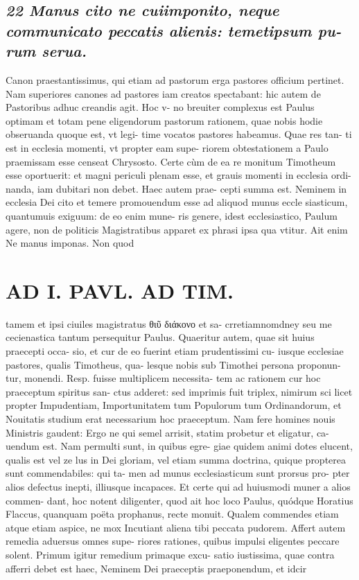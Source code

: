 \documentclass{article}
\begin{document}
\begin{pages}
\subsection*{\textit{22 Manus cito ne cuiimponito, neque communicato peccatis alienis: temetipsum pu- rum serua. }}\pstart Canon praestantissimus, qui etiam ad pastorum erga pastores officium pertinet. Nam superiores canones ad pastores iam creatos spectabant: hic autem de Pastoribus adhuc creandis agit. Hoc v- no breuiter complexus est Paulus optimam et totam pene eligendorum pastorum rationem, quae nobis hodie obseruanda quoque est, vt legi- time vocatos pastores habeamus. Quae res tan- ti est in ecclesia momenti, vt propter eam supe- riorem obtestationem a Paulo praemissam esse censeat Chrysosto. Certe cùm de ea re monitum Timotheum esse oportuerit: et magni periculi plenam esse, et grauis momenti in ecclesia ordi- nanda, iam dubitari non debet. Haec autem prae- cepti summa est. Neminem in ecclesia Dei cito et temere promouendum esse ad aliquod munus eccle siasticum, quantumuis exiguum: de eo enim mune- ris genere, idest ecclesiastico, Paulum agere, non de politicis Magistratibus apparet ex phrasi ipsa qua vtitur. Ait enim Ne manus imponas. Non quod  \pend
\section*{AD I. PAVL. AD TIM. }
\marginpar{[ p.338 ]}\pstart tamem et ipsi ciuiles magistratus θιῦ διάκονο et sa- crretiamnomdney seu me cecienastica tantum persequitur Paulus.  \pend\pstart Quaeritur autem, quae sit huius praecepti occa- sio, et cur de eo fuerint etiam prudentissimi cu- iusque ecclesiae pastores, qualis Timotheus, qua- lesque nobis sub Timothei persona proponun- tur, monendi. Resp. fuisse multiplicem necessita- tem ac rationem cur hoc praeceptum spiritus san- ctus adderet: sed imprimis fuit triplex, nimirum sci licet propter Impudentiam, Importunitatem tum Populorum tum Ordinandorum, et Nouitatis studium erat necessarium hoc praeceptum. Nam fere homines nouis Ministris gaudent: Ergo ne qui semel arrisit, statim probetur et eligatur, ca- uendum est. Nam permulti sunt, in quibus egre- giae quidem animi dotes elucent, qualis est vel ze lus in Dei gloriam, vel etiam summa doctrina, quique propterea sunt commendabiles: qui ta- men ad munus ecclesiasticum sunt prorsus pro- pter alios defectus inepti, illiusque incapaces. Et certe qui ad huiusmodi muner a alios commen- dant, hoc notent diligenter, quod ait hoc loco Paulus, quódque Horatius Flaccus, quanquam poëta prophanus, recte monuit. Qualem commendes etiam atque etiam aspice, ne mox Incutiant aliena tibi peccata pudorem.  \pend\pstart Affert autem remedia aduersus omnes supe- riores rationes, quibus impulsi eligentes peccare solent. Primum igitur remedium primaque excu- satio iustissima, quae contra afferri debet est haec, Neminem Dei praeceptis praeponendum, et idcir  \pend

\end{pages}
\end{document}
